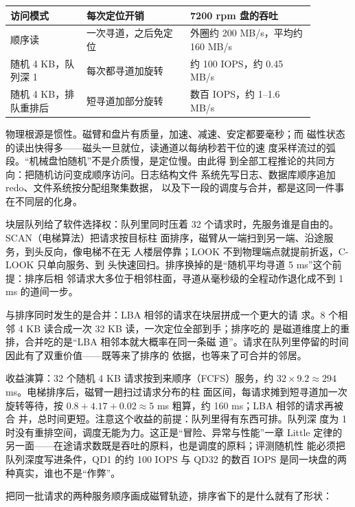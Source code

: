 \begin{longtable}{L{0.22\linewidth}L{0.30\linewidth}L{0.36\linewidth}}
\toprule
访问模式 & 每次定位开销 & 7200 rpm 盘的吞吐 \\
\midrule
顺序读 & 一次寻道，之后免定位 & 外圈约 200 MB/s，平均约 160 MB/s \\\tablerowrule
随机 4 KB，队列深 1 & 每次都寻道加旋转 & 约 100 IOPS，约 0.45 MB/s \\\tablerowrule
随机 4 KB，排队重排后 & 短寻道加部分旋转 & 数百 IOPS，约 1--1.6 MB/s \\
\bottomrule
\end{longtable}

物理根源是惯性。磁臂和盘片有质量，加速、减速、安定都要毫秒；而
磁性状态的读出快得多——磁头一旦就位，读通道以每纳秒若干位的速
度采样流过的弧段。“机械盘怕随机”不是介质慢，是定位慢。由此得
到全部工程推论的共同方向：把随机访问变成顺序访问。日志结构文件
系统先写日志、数据库顺序追加 redo、文件系统按分配组聚集数据，
以及下一段的调度与合并，都是这同一件事在不同层的化身。

块层队列给了软件选择权：队列里同时压着
32 个请求时，先服务谁是自由的。SCAN（电梯算法）把请求按目标柱
面排序，磁臂从一端扫到另一端、沿途服务，到头反向，像电梯不在无
人楼层停靠；LOOK 不到物理端点就提前折返，C-LOOK 只单向服务、到
头快速回扫。排序换掉的是“随机平均寻道 5 ms”这个前提：排序后相
邻请求大多位于相邻柱面，寻道从毫秒级的全程动作退化成不到 1 ms
的道间一步。

与排序同时发生的是合并：LBA 相邻的请求在块层拼成一个更大的请
求。8 个相邻 4 KB 读合成一次 32 KB 读，一次定位全部到手；排序吃的
是磁道维度上的重排，合并吃的是“LBA 相邻本就大概率在同一条磁
道”。请求在队列里停留的时间因此有了双重价值——既等来了排序的
依据，也等来了可合并的邻居。

收益演算：32 个随机 4 KB 请求按到来顺序（FCFS）服务，约
$32\times9.2\approx294$ ms。电梯排序后，磁臂一趟扫过请求分布的柱
面区间，每请求摊到短寻道加一次旋转等待，按
$0.8+4.17+0.02\approx5$ ms 粗算，约 160 ms；LBA 相邻的请求再被合
并，总时间更短。注意这个收益的前提：队列里得有东西可排。队列深
度为 1 时没有重排空间，调度无能为力。这正是“冒险、异常与性能”一章 Little 定律的
另一面——在途请求数既是吞吐的原料，也是调度的原料；评测随机性
能必须把队列深度写进条件，QD1 的约 100 IOPS 与 QD32 的数百 IOPS
是同一块盘的两种真实，谁也不是“作弊”。

把同一批请求的两种服务顺序画成磁臂轨迹，排序省下的是什么就有了形状：

